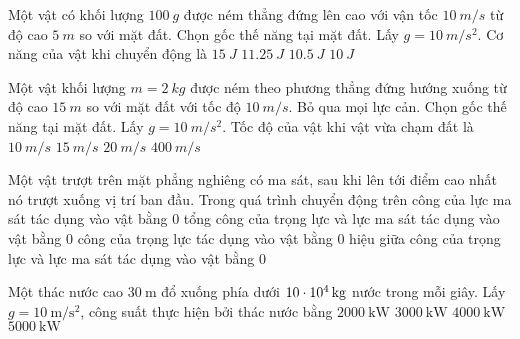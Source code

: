 \begin{ex}
	Một vật có khối lượng $\SI{100}{g}$ được ném thẳng đứng lên cao với vận tốc $\SI{10}{m/s}$ từ độ cao $\SI{5}{m}$ so với mặt đất. Chọn gốc thế năng tại mặt đất. Lấy $g=\SI{10}{m/s^2}$. Cơ năng của vật khi chuyển động là	
	\choice
	{$\SI{15}{J}$}
	{$\SI{11.25}{J}$}
	{$\SI{10.5}{J}$}
	{\True $\SI{10}{J}$}
\end{ex}
\begin{ex}
	Một vật khối lượng $m=\SI{2}{kg}$ được ném theo phương thẳng đứng hướng xuống từ độ cao $\SI{15}{m}$ so với mặt đất với tốc độ $\SI{10}{m/s}$. Bỏ qua mọi lực cản. Chọn gốc thế năng tại mặt đất. Lấy $g=\SI{10}{m/s^2}$. Tốc độ của vật khi vật vừa chạm đất là
	\choice
	{$\SI{10}{m/s}$}
	{$\SI{15}{m/s}$}
	{\True $\SI{20}{m/s}$}
	{$\SI{400}{m/s}$}
\end{ex}
\begin{ex}
	Một vật trượt trên mặt phẳng nghiêng có ma sát, sau khi lên tới điểm cao nhất nó trượt xuống vị trí ban đầu. Trong quá trình chuyển động trên	
	\choice
	{công của lực ma sát tác dụng vào vật bằng 0}
	{tổng công của trọng lực và lực ma sát tác dụng vào vật bằng 0}
	{\True công của trọng lực tác dụng vào vật bằng 0}
	{hiệu giữa công của trọng lực và lực ma sát tác dụng vào vật bằng 0}
\end{ex}
\begin{ex}
	Một thác nước cao $\SI{30}{\meter}$ đổ xuống phía dưới $\SI{10E4}{\kilogram}$ nước trong mỗi giây. Lấy $g =\SI{10}{\meter/\second^2}$, công suất thực hiện bởi thác nước bằng
	\choice
	{$\SI{2000}{\kilo\watt}$}
	{\True $\SI{3000}{\kilo\watt}$}
	{$\SI{4000}{\kilo\watt}$}
	{$\SI{5000}{\kilo\watt}$}
\end{ex}
